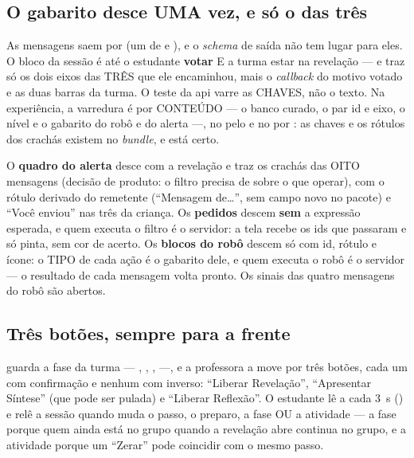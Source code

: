\subsection{O gabarito desce UMA vez, e só o das três}

As mensagens saem por  (um  de  e
), e o \emph{schema} de saída não tem lugar para eles. O bloco
 da sessão é  até o estudante \textbf{votar} E a turma
estar na revelação --- e traz só os dois eixos das TRÊS que ele encaminhou,
mais o \emph{callback} do motivo votado e as duas barras da turma. O teste da
api varre as CHAVES, não o texto. Na experiência, a varredura é por CONTEÚDO
--- o banco curado, o par id e eixo, o nível e o gabarito do robô e do alerta
---, no  pelo  e no  por : as chaves
 e os rótulos dos crachás existem no \emph{bundle}, e está
certo.

O \textbf{quadro do alerta} desce com a revelação e traz os crachás das OITO
mensagens (decisão de produto: o filtro precisa de sobre o que operar), com o
rótulo derivado do remetente (\enquote{Mensagem de\ldots}, sem campo novo no
pacote) e \enquote{Você enviou} nas três da criança. Os \textbf{pedidos}
descem \textbf{sem} a expressão esperada, e quem executa o filtro é o
servidor: a tela recebe os ids que passaram e só pinta, sem cor de acerto.
Os \textbf{blocos do robô} descem só com id, rótulo e ícone: o TIPO de cada
ação é o gabarito dele, e quem executa o robô é o servidor --- o resultado de
cada mensagem volta pronto. Os sinais das quatro mensagens do robô são
abertos.

\subsection{Três botões, sempre para a frente}

 guarda a fase da turma --- ,
, ,  ---, e a professora a move por três
botões, cada um com confirmação e nenhum com inverso: \enquote{Liberar
Revelação}, \enquote{Apresentar Síntese} (que pode ser pulada) e
\enquote{Liberar Reflexão}. O estudante lê  a cada 3~s
() e relê a sessão quando muda o passo, o preparo, a fase OU a
atividade --- a fase porque quem ainda está no grupo quando a revelação abre
continua no grupo, e a atividade porque um \enquote{Zerar} pode coincidir com o
mesmo passo.

